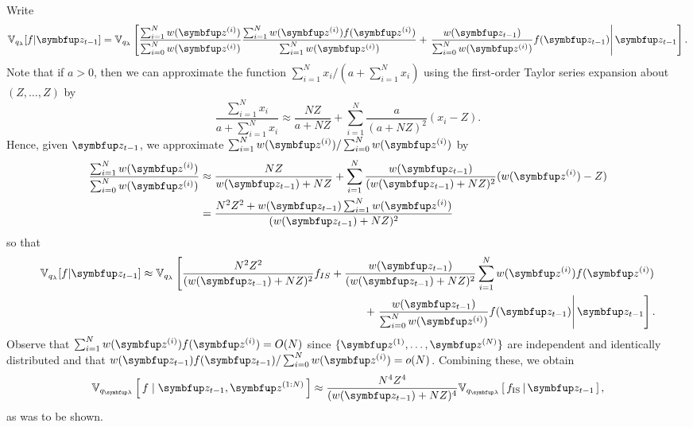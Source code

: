 \begin{proofEnd}
  Write
  \begin{align}
  \mathbb{V}_{q_\lambda}[f|\vz_{t-1}] = \mathbb{V}_{q_\lambda}\left[\frac{\sum_{i=1}^N w(\vz^{(i)})}{\sum_{i=0}^N w(\vz^{(i)})} \frac{\sum_{i=1}^N w(\vz^{(i)})f(\vz^{(i)})}{\sum_{i=1}^N w(\vz^{(i)})} + \left.\frac{w(\vz_{t-1})}{\sum_{i=0}^N w(\vz^{(i)})} f(\vz_{t-1})  \right\vert \vz_{t-1} \right].
  \end{align}
  Note that if $a>0$, then we can approximate the function $\sum_{i=1}^N x_i/(a+\sum_{i=1}^N x_i)$ using the first-order Taylor series expansion about $(Z,\dots,Z)$ by
  $$
  \frac{\sum_{i=1}^N x_i}{a+\sum_{i=1}^N x_i} \approx \frac{NZ}{a+NZ}+\sum_{i=1}^N \frac{a}{(a+NZ)^2} (x_i -Z).
  $$
  Hence, given $\vz_{t-1}$, we approximate $\sum_{i=1}^N w(\vz^{(i)})/\sum_{i=0}^N w(\vz^{(i)})$ by
  \begin{align}
  \frac{\sum_{i=1}^N w(\vz^{(i)})}{\sum_{i=0}^N w(\vz^{(i)})} &\approx \frac{NZ}{w(\vz_{t-1})+NZ} + \sum_{i=1}^N \frac{w(\vz_{t-1})}{(w(\vz_{t-1})+ NZ)^2} (w(\vz^{(i)})-Z) \\
    & = \frac{N^2 Z^2 + w(\vz_{t-1}) \sum_{i=1}^N w(\vz^{(i)})}{(w(\vz_{t-1})+NZ)^2}
  \end{align}
  so that
  \begin{align}
  \mathbb{V}_{q_\lambda}[f|\vz_{t-1}] \approx \mathbb{V}_{q_\lambda} \left[\frac{N^2Z^2}{(w(\vz_{t-1})+NZ)^2} f_{IS} + \frac{w(\vz_{t-1})}{(w(\vz_{t-1})+NZ)^2}\sum_{i=1}^N w(\vz^{(i)})f(\vz^{(i)})\right. \\ \left.
  + \left. \frac{w(\vz_{t-1})}{\sum_{i=0}^N w(\vz^{(i)})} f(\vz_{t-1}) \right\vert \vz_{t-1} \right].
  \end{align}
  Observe that $\sum_{i=1}^N w(\vz^{(i)}) f(\vz^{(i)}) = O(N)$ since $\{\vz^{(1)}, \dots, \vz^{(N)}\}$ are independent and identically distributed and that $w(\vz_{t-1})f(\vz_{t-1})/\sum_{i=0}^N w(\vz^{(i)})=o(N)$.
  Combining these, we obtain
  \begin{align}
    \Vsub{q_{\vlambda}}{  f \mid \vz_{t-1}, \vz^{(1:N)} } \approx \frac{N^4 Z^4}{(w(\vz_{t-1}) + NZ)^4} \Vsub{q_{\vlambda}}{ f_{\text{IS}} \,\middle\vert\, \vz_{t-1} },
  \end{align}
  as was to be shown.
\end{proofEnd}

